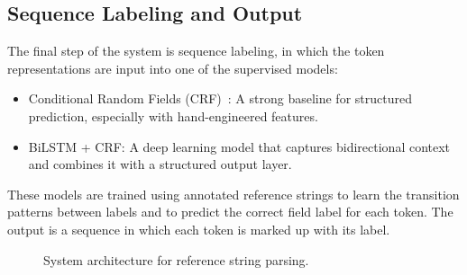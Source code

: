 \subsection{Sequence Labeling and Output}
The final step of the system is sequence labeling, in which the token representations are input into one of the supervised models:
\begin{itemize}
\item Conditional Random Fields (CRF)~\cite{crf2001}: A strong baseline for structured prediction, especially with hand-engineered features.
\item BiLSTM + CRF: A deep learning model that captures bidirectional context and combines it with a structured output layer.
\end{itemize}
These models are trained using annotated reference strings to learn the transition patterns between labels and to predict the correct field label for each token. The output is a sequence in which each token is marked up with its label.

\begin{figure}[ht]
    \centering
    
    \caption{System architecture for reference string parsing.}
    \label{fig:system-architecture}
\end{figure}